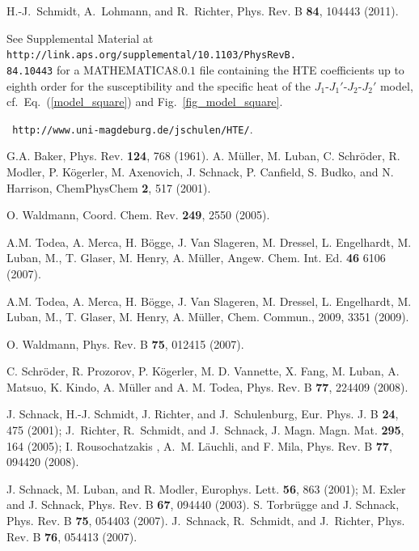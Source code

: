 \documentclass[aps,twocolumn,groupedaddress]{revtex4}
\begin{document}
\begin{thebibliography}{10}
H.-J.~Schmidt, A.~Lohmann, and R.~Richter,
Phys. Rev. B {\bf 84}, 104443 (2011).



See Supplemental Material at\\ {\tt http://link.aps.org/supplemental/10.1103/PhysRevB.\\84.10443}
for a MATHEMATICA$8.0.1$ file
containing the HTE coefficients up to eighth order for the
susceptibility and the specific heat  of the
$J_1$-$J_1'$-$J_2$-$J_2'$ model, cf.~Eq.~(\ref{model_square}) and
Fig.~\ref{fig_model_square}.



 {\tt
http://www.uni-magdeburg.de/jschulen/HTE/}.

G.A. Baker, Phys. Rev. {\bf 124}, 768 (1961).
 A. M\"uller, M. Luban, C. Schr\"oder, R. Modler, P.
K\"ogerler, M. Axenovich, J. Schnack, P. Canfield, S. Budko, and N.
Harrison,
ChemPhysChem {\bf 2}, 517 (2001).

  O. Waldmann, Coord. Chem. Rev. {\bf 249}, 2550 (2005).

A.M.  Todea, A. Merca,  H. B\"ogge, J. Van Slageren, M. Dressel,
L. Engelhardt, M. Luban, M., T. Glaser, M. Henry, A. M\"uller,
Angew. Chem. Int. Ed. {\bf 46} 6106 (2007).

A.M.  Todea, A. Merca,  H. B\"ogge, J. Van Slageren, M. Dressel,
L. Engelhardt, M. Luban, M., T. Glaser, M. Henry, A. M\"uller,
Chem. Commun., 2009, 3351 (2009).


  O. Waldmann,
Phys. Rev. B {\bf 75}, 012415 (2007).


C. Schr\"oder, R. Prozorov, P. K\"ogerler, M. D. Vannette, X. Fang,
M. Luban, A. Matsuo, K. Kindo, A. M\"uller and A. M. Todea,
Phys. Rev. B {\bf 77}, 224409 (2008).


 J. Schnack,  H.-J. Schmidt, J. Richter, and
J.~Schulenburg,    Eur. Phys. J. B {\bf 24}, 475 (2001);
J.\ Richter, R.\ Schmidt, and J.\ Schnack,
        J. Magn. Magn. Mat. {\bf 295}, 164 (2005); I. Rousochatzakis , A.~M. L\"{a}uchli, and F. Mila, Phys. Rev.
B {\bf 77}, 094420 (2008).


J. Schnack,  M. Luban, and R. Modler,
Europhys. Lett. {\bf 56}, 863 (2001); %
M. Exler and  J. Schnack,
Phys. Rev. B {\bf 67}, 094440   (2003). %
S. Torbr\"ugge and J. Schnack,
Phys. Rev. B {\bf 75}, 054403 (2007).
J.~Schnack,  R.~Schmidt, and J.~Richter,
         Phys. Rev. B {\bf 76}, 054413 (2007).


\end{thebibliography}
\end{document}
